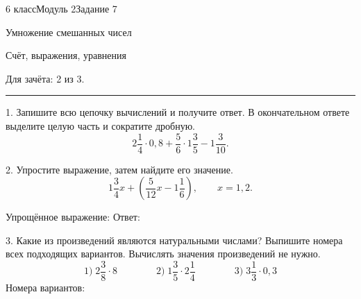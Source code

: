 \documentclass[11pt,a4paper]{article}
\newcommand{\mixed}[3]{#1\frac{#2}{#3}}
\newcommand{\answerrow}{%
  \par\vspace{3pt}\noindent\small
  Упрощённое выражение: \fbox{\rule{0pt}{17pt}\hspace{132pt}}%
  \hfill Ответ: \fbox{\rule{0pt}{17pt}\hspace{76pt}}\normalsize\par}
\begin{document}
{\small 6 класс\enspace\textperiodcentered\enspace Модуль 2\enspace\textperiodcentered\enspace Задание 7}\par
\vspace{5pt}
{\fontsize{17}{21}\selectfont Умножение смешанных чисел}\par
\vspace{2pt}
{\fontsize{13}{16}\selectfont Счёт, выражения, уравнения}\par
\vspace{7pt}
Для зачёта: 2 из 3.\par
\vspace{7pt}
{\color{black!25}\hrule}
\vspace{10pt}

1. Запишите всю цепочку вычислений и получите ответ.
В окончательном ответе выделите целую часть и сократите дробную.
\[
  \mixed{2}{1}{4}\cdot0{,}8+\frac56\cdot\mixed{1}{3}{5}-\mixed{1}{3}{10}.
\]
\vspace{-4pt}
\noindent{\color{black!30}\rule{\dimexpr\linewidth-2pt\relax}{0.35pt}}\par\vspace{16pt}
\noindent{\color{black!30}\rule{\dimexpr\linewidth-2pt\relax}{0.35pt}}\par
\vspace{12pt}

2. Упростите выражение, затем найдите его значение.
\[
  \mixed{1}{3}{4}x+\left(\frac5{12}x-\mixed{1}{1}{6}\right),\qquad x=1{,}2.
\]
\answerrow\vspace{16pt}

\Needspace{96pt}
3. Какие из произведений являются натуральными числами?
Выпишите номера всех подходящих вариантов. Вычислять значения произведений не нужно.
\[
  \text{1)}\;\mixed{2}{3}{8}\cdot8
  \qquad\qquad
  \text{2)}\;\mixed{1}{3}{5}\cdot\mixed{2}{1}{4}
  \qquad\qquad
  \text{3)}\;\mixed{3}{1}{3}\cdot0{,}3
\]
\vspace{-4pt}
Номера вариантов: \fbox{\rule{0pt}{17pt}\hspace{110pt}}
\end{document}
